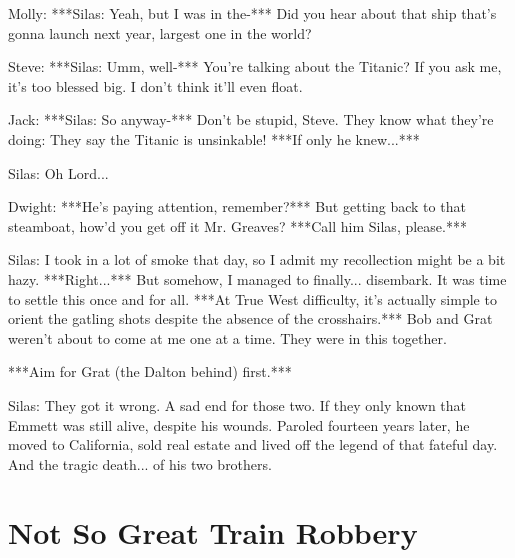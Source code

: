 \documentclass{article}
\begin{document}
Molly: ***Silas: Yeah, but I was in the-*** Did you hear about that ship that's gonna launch next year, largest one in the world?

Steve: ***Silas: Umm, well-*** You're talking about the Titanic? If you ask me, it's too blessed big. I don't think it'll even float.

Jack: ***Silas: So anyway-*** Don't be stupid, Steve. They know what they're doing: They say the Titanic is unsinkable! ***If only he knew...***

Silas: Oh Lord...

Dwight: ***He's paying attention, remember?*** But getting back to that steamboat, how'd you get off it Mr. Greaves? ***Call him Silas, please.***

Silas: I took in a lot of smoke that day, so I admit my recollection might be a bit hazy. ***Right...*** But somehow, I managed to finally... disembark. It was time to settle this once and for all. ***At True West difficulty, it's actually simple to orient the gatling shots despite the absence of the crosshairs.*** Bob and Grat weren't about to come at me one at a time. They were in this together.

***Aim for Grat (the Dalton behind) first.***

Silas: They got it wrong. A sad end for those two. If they only known that Emmett was still alive, despite his wounds. Paroled fourteen years later, he moved to California, sold real estate and lived off the legend of that fateful day. And the tragic death... of his two brothers.

\section*{Not So Great Train Robbery}
\end{document}
